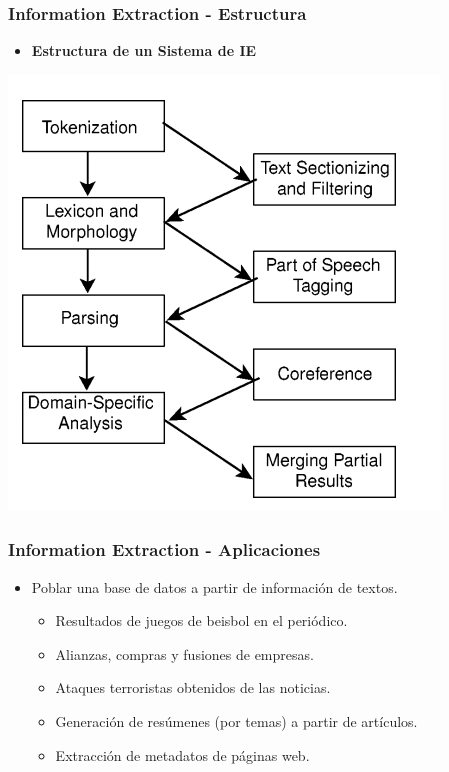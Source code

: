 \documentclass[xcolor=dvipsnames]{beamer}
\begin{document}
\begin{frame}
\frametitle{Information Extraction - Estructura}

\begin{center}
\begin{itemize}
 \item \textbf{Estructura de un Sistema de IE}
\end{itemize}
 \includegraphics[scale=0.35]{estructura.png}
\end{center}

\end{frame}

\begin{frame}
\frametitle{Information Extraction - Aplicaciones}
\begin{itemize}
 \item Poblar una base de datos a partir de información de textos.
	\begin{itemize}
	 \item Resultados de juegos de beisbol en el periódico.
	 \item Alianzas, compras y fusiones de empresas.
	 \item Ataques terroristas obtenidos de las noticias.
	 \item Generación de resúmenes (por temas) a partir de artículos.
	 \item Extracción de metadatos de páginas web.
	\end{itemize}
\end{itemize}
\end{frame}
\end{document}
